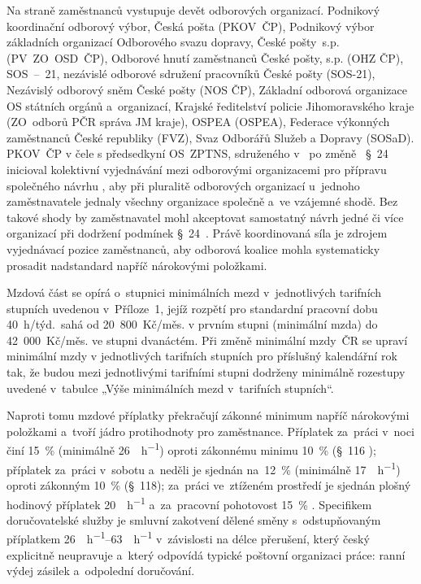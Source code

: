 Na straně zaměstnanců vystupuje devět odborových organizací. Podnikový koordinační odborový výbor, Česká pošta (\acs{PKOV}~\acs{ČP}), Podnikový výbor základních organizací Odborového svazu dopravy, České pošty~s.p. (PV~ZO~OSD~\acs{ČP}), Odborové hnutí zaměstnanců České pošty, s.p. (OHZ \acs{ČP}), SOS~--~21, nezávislé odborové sdružení pracovníků České pošty (SOS-21), Nezávislý odborový sněm České pošty (NOS \acs{ČP}), Základní odborová organizace \acs{OS} státních orgánů a~organizací, Krajské ředitelství policie Jihomoravského kraje (ZO~odborů PČR správa JM kraje), OSPEA (OSPEA), Federace výkonných zaměstnanců České republiky (FVZ), Svaz Odborářů Služeb a Dopravy (SOSaD). 
\acs{PKOV}~\acs{ČP} v čele s předsedkyní \acs{OS}~ZPTNS, sdruženého v~ po změně ~\S~24 inicioval kolektivní vyjednávání mezi odborovými organizacemi pro přípravu společného návrhu , aby při pluralitě odborových organizací u~jednoho zaměstnavatele jednaly všechny organizace společně a~ve vzájemné shodě. Bez takové shody by zaměstnavatel mohl akceptovat samostatný návrh jedné či více organizací při dodržení podmínek \S~24~. Právě koordinovaná síla je zdrojem vyjednávací pozice zaměstnanců, aby odborová koalice mohla systematicky prosadit nadstandard napříč nárokovými položkami.\par

Mzdová část se opírá o~stupnici minimálních mezd v~jednotlivých tarifních stupních uvedenou v~Příloze~1, jejíž rozpětí pro standardní pracovní dobu 40~h/týd.~sahá od 20~800~Kč/měs. v prvním stupni (minimální mzda) do 42~000~Kč/měs. ve stupni dvanáctém.
Při změně minimální mzdy~\acs{ČR} se upraví minimální mzdy v jednotlivých tarifních stupních pro příslušný kalendářní rok tak, že budou mezi jednotlivými tarifními stupni dodrženy minimálně rozestupy uvedené v~tabulce „Výše minimálních mezd v~tarifních stupních“.\par

Naproti tomu mzdové příplatky překračují zákonné minimum napříč nárokovými položkami a~tvoří jádro protihodnoty pro zaměstnance.
Příplatek za~práci v~noci činí \SI{15}{\percent}  (minimálně \SI{26}{\czk\per\hour}) oproti zákonnému minimu \SI{10}{\percent} (\mbox{§~116} ); příplatek za~práci v~sobotu a~neděli je sjednán na~\SI{12}{\percent}  (minimálně \SI{17}{\czk\per\hour}) oproti zákonným \SI{10}{\percent} (\mbox{§~118}); za~práci ve~ztíženém prostředí je sjednán plošný hodinový příplatek \SI{20}{\czk\per\hour} a~za~pracovní pohotovost \SI{15}{\percent} .
Specifikem doručovatelské služby je smluvní zakotvení dělené směny s~odstupňovaným příplatkem \SIrange{26}{63}{\czk\per\hour} v~závislosti na délce přerušení, který český  explicitně neupravuje a~který odpovídá typické poštovní organizaci práce: ranní výdej zásilek a~odpolední doručování.\par

